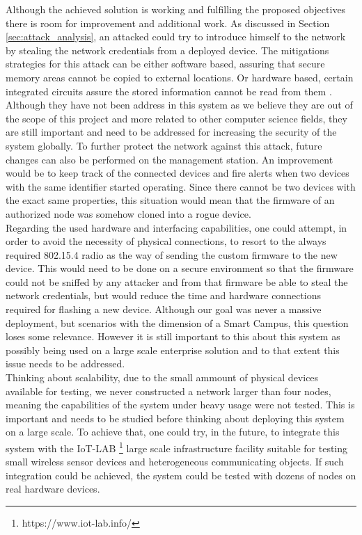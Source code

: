Although the achieved solution is working and fulfilling the proposed objectives there is room for improvement and additional work. As discussed in Section \ref{sec:attack_analysis}, an attacked could try to introduce himself to the network by stealing the network credentials from a deployed device. The mitigations strategies for this attack can be either software based,  assuring that secure memory areas cannot be copied to external locations. Or hardware based, certain integrated circuits assure the stored information cannot be read from them \cite{Lesjak2014}. Although they have not been address in this system as we believe they are out of the scope of this project and more related to other computer science fields, they are still important and need to be addressed for increasing the security of the system globally. 
To further protect the network against this attack, future changes can also be performed on the management station. An improvement would be to keep track of the connected devices and fire alerts when two devices with the same identifier started operating. Since there cannot be two devices with the exact same properties, this situation would mean that the firmware of an authorized node was somehow cloned into a rogue device.
\\
Regarding the used hardware and interfacing capabilities, one could attempt, in order to avoid the necessity of physical connections, to resort to the always required 802.15.4 radio as the way of sending the custom firmware to the new device. This would need to be done on a secure environment so that the firmware could not be sniffed by any attacker and from that firmware be able to steal the network credentials, but would reduce the time and hardware connections required for flashing a new device. Although our goal was never a massive deployment, but scenarios with the dimension of a Smart Campus, this question loses some relevance. However it is still important to this about this system as possibly being used on a large scale enterprise solution and to that extent this issue needs to be addressed.\\
Thinking about scalability, due to the small ammount of physical devices available for testing, we never constructed a network larger than four nodes, meaning the capabilities of the system under heavy usage were not tested. This is important and needs to be studied before thinking about deploying this system on a large scale. To achieve that, one could try, in the future, to integrate this system with the IoT-LAB \footnote{https://www.iot-lab.info/} large scale infrastructure facility suitable for testing small wireless sensor devices and heterogeneous communicating objects. If such integration could be achieved, the system could be tested with dozens of nodes on real hardware devices.\\


